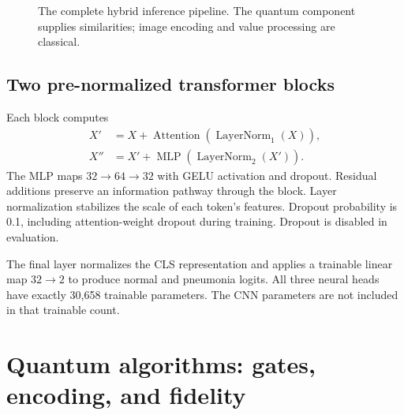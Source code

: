 \documentclass[11pt,a4paper]{report}
\begin{document}
\begin{figure}[htbp]\centering
{}
\caption{The complete hybrid inference pipeline. The quantum component supplies similarities; image encoding and value processing are classical.}
\end{figure}

\section{Two pre-normalized transformer blocks}
Each block computes
\begin{align}
X'&=X+\operatorname{Attention}(\operatorname{LayerNorm}_1(X)),\\
X''&=X'+\operatorname{MLP}(\operatorname{LayerNorm}_2(X')).
\end{align}
The MLP maps $32\rightarrow64\rightarrow32$ with GELU activation and dropout. Residual additions preserve an information pathway through the block. Layer normalization stabilizes the scale of each token's features. Dropout probability is 0.1, including attention-weight dropout during training. Dropout is disabled in evaluation.

The final layer normalizes the CLS representation and applies a trainable linear map $32\rightarrow2$ to produce normal and pneumonia logits. All three neural heads have exactly 30,658 trainable parameters. The CNN parameters are not included in that trainable count.

\chapter{Quantum algorithms: gates, encoding, and fidelity}
\end{document}
